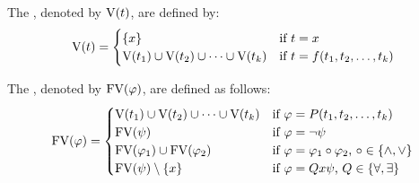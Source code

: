 \begin{definition}
	The , denoted by $\text{V}(t)$, are defined by:
	\[\V(t)=
		\begin{cases}
			\{x\}                                    & \text{if $t=x$}                    \\ %
			\V(t_1)\cup \V(t_2)\cup\dots\cup \V(t_k) & \text{if $t=f(t_1,t_2,\dots,t_k)$} 
		\end{cases}\]
	
	The , denoted by $\text{FV}(\varphi)$, are defined as follows:
	\[\FV(\varphi)=
		\begin{cases} %
			\V(t_1)\cup \V(t_2)\cup\dots\cup \V(t_k) & \text{if $\varphi=P(t_1,t_2,\dots,t_k)$}                               \\
			\FV(\psi)                                 & \text{if $\varphi=\neg\psi$}                               \\
			\FV(\varphi_1)\cup\FV(\varphi_2)         & \text{if $\varphi=\varphi_1\circ\varphi_2$, $\circ\in\{\wedge,\vee\}$} \\
			\FV(\psi)\setminus\{x\}                  & \text{if $\varphi=Q x\psi$, $Q\in\{\forall,\exists\}$}                 
		\end{cases}\]
\end{definition}

